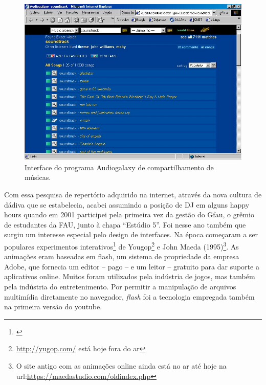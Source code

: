 \begin{figure}

\includegraphics[width=1\textwidth]{pictures/cap1/audiogalaxy}
\caption{Interface do programa Audiogalaxy de compartilhamento de músicas.}
\label{fig:audiogalaxy}
\end{figure}


Com essa pesquisa de repertório adquirido na internet, através da nova cultura de dádiva que se estabelecia, acabei assumindo a posição de DJ em alguns happy hours quando em 2001 participei pela primeira vez da gestão do Gfau, o grêmio de estudantes da FAU, junto à chapa ``Estúdio 5''. Foi nesse ano também que surgiu um interesse especial pelo design de interfaces. Na época começaram a ser populares experimentos interativos\footnote{\cite{Pindado2005}} de Yougop\footnote{\url{http://yugop.com/} está hoje fora do ar} e John Maeda (1995)\footnote{O site antigo com as animações online ainda está no ar até hoje na url:\url{https://maedastudio.com/oldindex.php}}. As animações eram baseadas em flash, um sistema de propriedade da empresa Adobe, que fornecia um editor -- pago -- e um leitor -- gratuito para dar suporte a aplicativos online. Muitos foram utilizados pela indústria de jogos, mas também pela indústria do entretenimento. Por permitir a manipulação de arquivos multimídia diretamente no navegador, \emph{flash} foi a tecnologia empregada também na primeira versão do youtube. 


